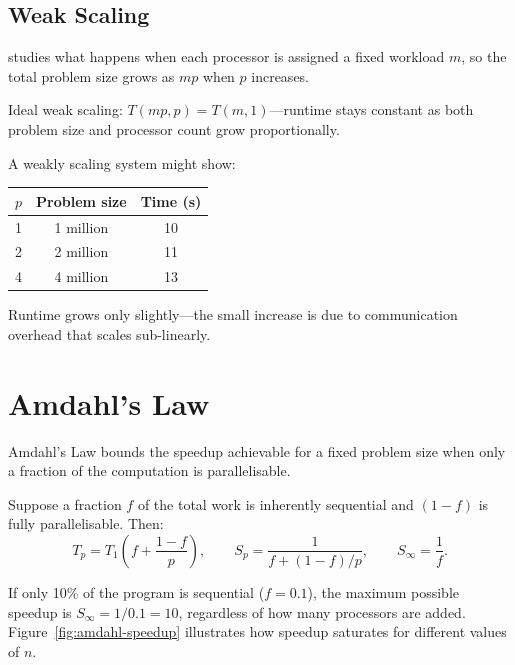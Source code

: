 \subsection{Weak Scaling}

 studies what happens when each processor is assigned a
fixed workload $m$, so the total problem size grows as $mp$ when $p$ increases.

\begin{ppdefn}
Ideal weak scaling: $T(mp, p) = T(m, 1)$---runtime stays constant as both
problem size and processor count grow proportionally.
\end{ppdefn}

\begin{ppexample}
A weakly scaling system might show:
\begin{center}
\begin{tabular}{ccc}
\toprule
$p$ & Problem size & Time (s) \\
\midrule
1  & 1 million & 10 \\
2  & 2 million & 11 \\
4  & 4 million & 13 \\
\bottomrule
\end{tabular}
\end{center}
Runtime grows only slightly---the small increase is due to communication
overhead that scales sub-linearly.
\end{ppexample}

\section{Amdahl's Law}

\begin{ppkey}
Amdahl's Law bounds the speedup achievable for a fixed problem size when
only a fraction of the computation is parallelisable.
\end{ppkey}

Suppose a fraction $f$ of the total work is inherently sequential and
$(1 - f)$ is fully parallelisable. Then:
\[
  T_p = T_1\!\left(f + \frac{1-f}{p}\right),
  \qquad
  S_p = \frac{1}{f + (1-f)/p},
  \qquad
  S_\infty = \frac{1}{f}.
\]

\begin{ppexample}
If only 10\% of the program is sequential ($f = 0.1$), the maximum possible
speedup is $S_\infty = 1/0.1 = 10$, regardless of how many processors are
added. Figure~\ref{fig:amdahl-speedup} illustrates how speedup saturates for
different values of $n$.
\end{ppexample}

